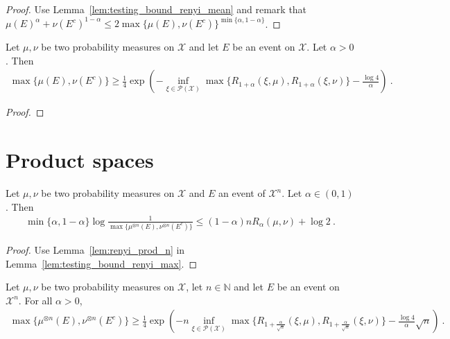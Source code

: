 \begin{proof}
Use Lemma~\ref{lem:testing_bound_renyi_mean} and remark that $\mu(E)^\alpha + \nu(E^c)^{1 - \alpha} \le 2\max\{\mu(E), \nu(E^c)\}^{\min\{\alpha, 1 - \alpha\}}$.
\end{proof}


\begin{lemma}
  \label{lem:testing_bound_renyi_one_add}
  Let $\mu, \nu$ be two probability measures on $\mathcal X$ and let $E$ be an event on $\mathcal X$. Let $\alpha > 0$. Then
  \begin{align*}
  \max\{\mu(E), \nu(E^c)\} \ge \frac{1}{4}\exp\left( - \inf_{\xi \in \mathcal P(\mathcal X)}\max\{R_{1+\alpha}(\xi, \mu), R_{1+\alpha}(\xi, \nu)\} - \frac{\log 4}{\alpha}\right) \: .
  \end{align*}
\end{lemma}

\begin{proof}
\end{proof}


\section{Product spaces}

\begin{corollary}
  \label{cor:testing_bound_renyi_n}
  Let $\mu, \nu$ be two probability measures on $\mathcal X$ and $E$ an event of $\mathcal X^n$. Let $\alpha \in (0,1)$. Then
  \begin{align*}
  \min\{\alpha, 1 - \alpha\} \log\frac{1}{\max\{\mu^{\otimes n}(E), \nu^{\otimes n}(E^c)\}} \le (1 - \alpha) n R_{\alpha}(\mu, \nu)  + \log 2 \: .
  \end{align*}
\end{corollary}

\begin{proof}
Use Lemma~\ref{lem:renyi_prod_n} in Lemma~\ref{lem:testing_bound_renyi_max}.
\end{proof}

\begin{lemma}
  \label{lem:testing_bound_renyi_one_add_n}
  Let $\mu, \nu$ be two probability measures on $\mathcal X$, let $n \in \mathbb{N}$ and let $E$ be an event on $\mathcal X^n$. For all $\alpha > 0$,
  \begin{align*}
  \max\{\mu^{\otimes n}(E), \nu^{\otimes n}(E^c)\} \ge \frac{1}{4}\exp\left( - n \inf_{\xi \in \mathcal P(\mathcal X)}\max\{R_{1+\frac{\alpha}{\sqrt{n}}}(\xi, \mu), R_{1+\frac{\alpha}{\sqrt{n}}}(\xi, \nu)\} - \frac{\log 4}{\alpha}\sqrt{n}\right) \: .
  \end{align*}
\end{lemma}

